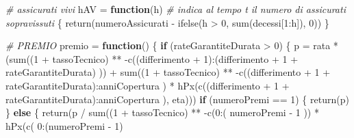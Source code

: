 \documentclass[
]{article}
\newenvironment{Shaded}{\begin{snugshade}}{\end{snugshade}}
\newcommand{\CommentTok}[1]{\textcolor[rgb]{0.56,0.35,0.01}{\textit{#1}}}
\newcommand{\ControlFlowTok}[1]{\textcolor[rgb]{0.13,0.29,0.53}{\textbf{#1}}}
\newcommand{\DecValTok}[1]{\textcolor[rgb]{0.00,0.00,0.81}{#1}}
\newcommand{\FunctionTok}[1]{\textcolor[rgb]{0.00,0.00,0.00}{#1}}
\newcommand{\NormalTok}[1]{#1}
\newcommand{\OtherTok}[1]{\textcolor[rgb]{0.56,0.35,0.01}{#1}}
\newcommand{\SpecialCharTok}[1]{\textcolor[rgb]{0.00,0.00,0.00}{#1}}
\begin{document}
\begin{Shaded}
\begin{Highlighting}[]
  \CommentTok{\# assicurati vivi}
\NormalTok{  hAV }\OtherTok{=} \ControlFlowTok{function}\NormalTok{(h)}
    \CommentTok{\# indica al tempo t il numero di assicurati sopravissuti}
\NormalTok{  \{}
    \FunctionTok{return}\NormalTok{(numeroAssicurati }\SpecialCharTok{{-}} \FunctionTok{ifelse}\NormalTok{(h }\SpecialCharTok{\textgreater{}} \DecValTok{0}\NormalTok{, }\FunctionTok{sum}\NormalTok{(decessi[}\DecValTok{1}\SpecialCharTok{:}\NormalTok{h]), }\DecValTok{0}\NormalTok{))}
\NormalTok{  \}}
  
  
  \CommentTok{\# PREMIO}
\NormalTok{  premio }\OtherTok{=} \ControlFlowTok{function}\NormalTok{()}
\NormalTok{  \{}
    \ControlFlowTok{if}\NormalTok{ (rateGarantiteDurata }\SpecialCharTok{\textgreater{}} \DecValTok{0}\NormalTok{)}
\NormalTok{    \{}
\NormalTok{      p }\OtherTok{=}\NormalTok{ rata }\SpecialCharTok{*}\NormalTok{ (}\FunctionTok{sum}\NormalTok{((}\DecValTok{1} \SpecialCharTok{+}\NormalTok{ tassoTecnico) }\SpecialCharTok{**} \SpecialCharTok{{-}}\FunctionTok{c}\NormalTok{((differimento }\SpecialCharTok{+} \DecValTok{1}\NormalTok{)}\SpecialCharTok{:}\NormalTok{(differimento }\SpecialCharTok{+} \DecValTok{1} \SpecialCharTok{+}\NormalTok{ rateGarantiteDurata)}
\NormalTok{      )) }\SpecialCharTok{+} \FunctionTok{sum}\NormalTok{((}\DecValTok{1} \SpecialCharTok{+}\NormalTok{ tassoTecnico) }\SpecialCharTok{**} \SpecialCharTok{{-}}\FunctionTok{c}\NormalTok{((differimento }\SpecialCharTok{+} \DecValTok{1} \SpecialCharTok{+}\NormalTok{ rateGarantiteDurata)}\SpecialCharTok{:}\NormalTok{anniCopertura}
\NormalTok{      ) }\SpecialCharTok{*} \FunctionTok{hPx}\NormalTok{(}\FunctionTok{c}\NormalTok{((differimento }\SpecialCharTok{+} \DecValTok{1} \SpecialCharTok{+}\NormalTok{ rateGarantiteDurata)}\SpecialCharTok{:}\NormalTok{anniCopertura}
\NormalTok{      ), eta)))}
      \ControlFlowTok{if}\NormalTok{ (numeroPremi }\SpecialCharTok{==} \DecValTok{1}\NormalTok{)}
\NormalTok{      \{}
        \FunctionTok{return}\NormalTok{(p)}
\NormalTok{      \} }\ControlFlowTok{else}
\NormalTok{      \{}
        \FunctionTok{return}\NormalTok{(p }\SpecialCharTok{/} \FunctionTok{sum}\NormalTok{((}\DecValTok{1} \SpecialCharTok{+}\NormalTok{ tassoTecnico) }\SpecialCharTok{**} \SpecialCharTok{{-}}\FunctionTok{c}\NormalTok{(}\DecValTok{0}\SpecialCharTok{:}\NormalTok{(}
\NormalTok{          numeroPremi }\SpecialCharTok{{-}} \DecValTok{1}
\NormalTok{        )) }\SpecialCharTok{*} \FunctionTok{hPx}\NormalTok{(}\FunctionTok{c}\NormalTok{(}
          \DecValTok{0}\SpecialCharTok{:}\NormalTok{(numeroPremi }\SpecialCharTok{{-}} \DecValTok{1}\NormalTok{)}

\end{Highlighting}
\end{Shaded}
\end{document}

